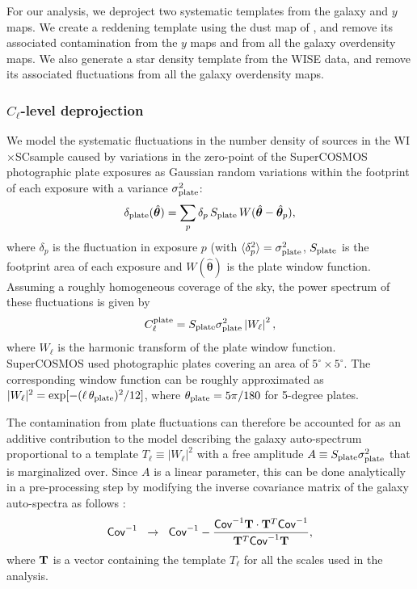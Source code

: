 \documentclass[useAMS,usenatbib]{mn2e}
\newcommand{\nv}{\hat{\boldsymbol{\theta}}}
\newcommand{\wisc}{WI$\times$SC}
\begin{document}
      For our analysis, we deproject two systematic templates from the galaxy and $y$ maps. We create a reddening template using the dust map of \cite{1998ApJ...500..525S}, and remove its associated contamination from the $y$ maps and from all the galaxy overdensity maps. We also generate a star density template from the WISE data, and remove its associated fluctuations from all the galaxy overdensity maps.

    \subsubsection{$C_\ell$-level deprojection}\label{sssec:methods.syst.plates}
      We model the systematic fluctuations in the number density of sources in the \wisc sample caused by variations in the zero-point of the SuperCOSMOS photographic plate exposures as Gaussian random variations within the footprint of each exposure with a variance $\sigma^2_{\rm plate}$:
      \begin{equation}
        \delta_{\rm plate}(\nv) = \sum_p \delta_p\,S_{\rm plate}\,W(\nv-\nv_p),
      \end{equation}
      where $\delta_p$ is the fluctuation in exposure $p$ (with $\langle\delta_p^2\rangle=\sigma^2_{\rm plate}$, $S_{\rm plate}$ is the footprint area of each exposure and $W(\nv)$ is the plate window function. Assuming a roughly homogeneous coverage of the sky, the power spectrum of these fluctuations is given by
      \begin{equation}
        C_\ell^{\rm plate}=S_{\rm plate}\sigma_{\rm plate}^2\left|W_\ell\right|^2,
      \end{equation}
      where $W_\ell$ is the harmonic transform of the plate window function. SuperCOSMOS used photographic plates covering an area of $5^\circ\times5^\circ$. The corresponding window function can be roughly approximated as $|W_\ell|^2=\exp[-(\ell\,\theta_{\rm plate})^2/12]$, where $\theta_{\rm plate}=5\pi/180$ for 5-degree plates.
      
      The contamination from plate fluctuations can therefore be accounted for as an additive contribution to the model describing the galaxy auto-spectrum proportional to a template $T_\ell\equiv|W_\ell|^2$ with a free amplitude $A\equiv S_{\rm plate}\sigma_{\rm plate}^2$ that is marginalized over. Since $A$ is a linear parameter, this can be done analytically in a pre-processing step by modifying the inverse covariance matrix of the galaxy auto-spectra as follows \cite{1992ApJ...398..169R}:
      \begin{equation}
        {\sf Cov}^{-1}\hspace{6pt}\rightarrow\hspace{6pt} {\sf Cov}^{-1}-\frac{{\sf Cov}^{-1}{\bf T}\cdot{\bf T}^T{\sf Cov}^{-1}}{{\bf T}^T{\sf Cov}^{-1}{\bf T}},
      \end{equation}
      where ${\bf T}$ is a vector containing the template $T_\ell$ for all the scales used in the analysis.
\end{document}
